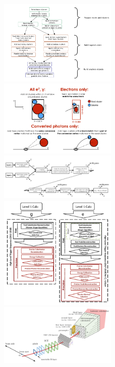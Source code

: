 

\begin{figure}
  \includegraphics[width=0.5\textwidth]{images_tmp/trigger/1.png} %
  \includegraphics[width=0.5\textwidth]{images_tmp/trigger/2.png} %
  \includegraphics[width=0.5\textwidth]{images_tmp/trigger/3.png} %
  \includegraphics[width=0.5\textwidth]{images_tmp/trigger/4.png} %
  \includegraphics[width=0.5\textwidth]{images_tmp/trigger/5.png} %
\end{figure}


